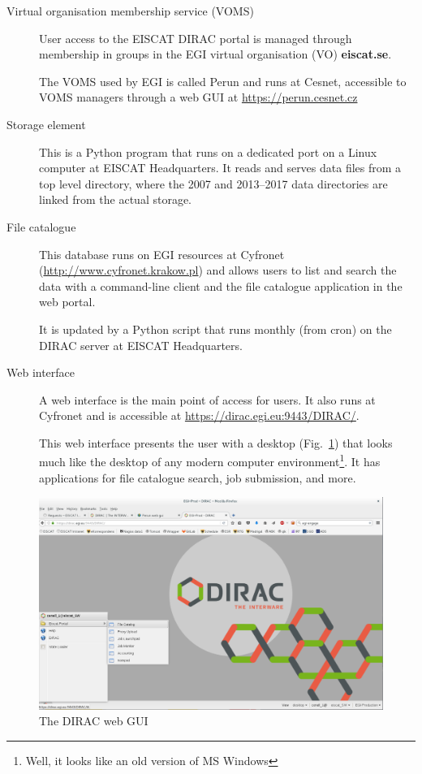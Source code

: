 \documentclass[a4paper]{article}
\begin{document}
\begin{description}

\item[Virtual organisation membership service (VOMS)] User access to the
  EISCAT DIRAC portal is managed through membership in groups in the
  EGI virtual organisation (VO) \textbf{eiscat.se}.  

  The VOMS used by EGI is called Perun and runs
  at Cesnet, accessible to VOMS managers through a web GUI at
  \url{https://perun.cesnet.cz}

\item[Storage element] This is a Python program that runs on a
  dedicated port on a Linux computer at EISCAT Headquarters. It reads
  and serves data files from a top level directory, where the 2007 and
  2013--2017 data directories are linked from the actual storage.

\item[File catalogue] This database runs on EGI resources at Cyfronet
  (\url{http://www.cyfronet.krakow.pl}) and allows users
  to list and search the data with a command-line client and the file
  catalogue application in the web portal.  

  It is updated by a Python script that runs monthly (from cron) on
  the DIRAC server at EISCAT Headquarters.

\item[Web interface] A web interface is the main point of access for
  users. It also runs at Cyfronet and is accessible at
  \url{https://dirac.egi.eu:9443/DIRAC/}. 

  This web interface presents the user with a desktop
  (Fig.~\ref{fig:portal}) that looks much like the desktop of any
  modern computer environment\footnote{Well, it looks like an old version of MS Windows}.  It has applications for file catalogue
  search, job submission, and more.

\end{description}
\begin{figure}[htb]
  \centering
  \includegraphics[width=1.0\linewidth]{dirac-gui-desktop}
  \caption{The DIRAC web GUI}
  \label{fig:portal}
\end{figure}
\end{document}
